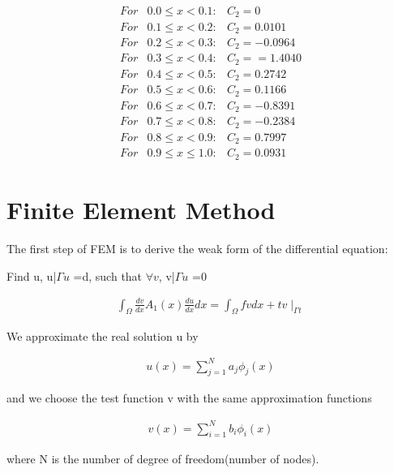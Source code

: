 \documentclass[paper=a4, fontsize=11pt]{article} %
\begin{document}
\begin{eqnarray}
For & 0.0 \leq x < 0.1 :& C_2 = 0 \nonumber\\
For & 0.1 \leq x < 0.2 :& C_2 = 0.0101\nonumber\\
For & 0.2 \leq x < 0.3 :& C_2 = -0.0964 \nonumber\\
For & 0.3 \leq x < 0.4 :& C_2 = =1.4040 \nonumber\\
For & 0.4 \leq x < 0.5 :& C_2 = 0.2742 \nonumber\\
For & 0.5 \leq x < 0.6 :& C_2 = 0.1166 \nonumber\\
For & 0.6 \leq x < 0.7 :& C_2 = -0.8391 \nonumber\\
For & 0.7 \leq x < 0.8 :& C_2 = -0.2384 \nonumber\\
For & 0.8 \leq x < 0.9 :& C_2 = 0.7997\nonumber\\
For & 0.9 \leq x \leq 1.0 :& C_2 = 0.0931
\end{eqnarray}

\section{Finite Element Method}
The first step of FEM is to derive the weak form of the differential equation:

Find u, u|$\Gamma u$ =d, such that $\forall v$, v|$\Gamma u$ =0

\begin{eqnarray}
\int_{\Omega} \frac{dv}{dx} A_1(x) \frac{du}{dx} dx = \int_{\Omega} fv dx + tv \mid _{\Gamma t}
\end{eqnarray}


We approximate the real solution u by

\begin{eqnarray}
u(x) = \sum_{j=1}^{N} a_j \phi_j(x)
\end{eqnarray}

and we choose the test function v with the same approximation functions

\begin{eqnarray}
v(x) = \sum_{i=1}^{N} b_i \phi_i(x)
\end{eqnarray}

where N is the number of degree of freedom(number of nodes). 
\end{document}
